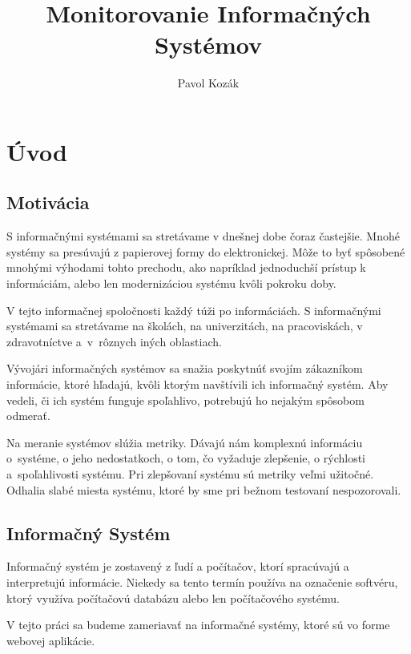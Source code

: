 \documentclass[a4paper, usesections, upjsfrontpage, thesismargins, thesislinespacing, twoside]{rnthesissvk}
\title{Monitorovanie Informačných Systémov}
\author{Pavol Kozák}
\begin{document}
\maketitle
\newpage

\setcounter{tocdepth}{3}
\tableofcontents

\newpage
\section{Úvod}

\subsection{Motivácia}

S informačnými systémami sa stretávame v dnešnej dobe čoraz častejšie. 
Mnohé systémy sa presúvajú z papierovej formy do elektronickej.
Môže to byť spôsobené mnohými výhodami tohto prechodu, ako napríklad jednoduchší prístup k informáciám, alebo len modernizáciou systému kvôli pokroku doby.

V tejto informačnej spoločnosti každý túži po informáciách.
S informačnými systémami sa stretávame na školách, na univerzitách, na pracoviskách, v zdravot\-níc\-tve a~v~rôznych iných oblastiach.

Vývojári informačných systémov sa snažia poskytnúť svojím zákazníkom informácie, ktoré hľadajú, kvôli ktorým navštívili ich informačný systém.
Aby vedeli, či ich systém funguje spoľahlivo, potrebujú ho nejakým spôsobom odmerať.

Na meranie systémov slúžia metriky.
Dávajú nám komplexnú informáciu o~systéme, o jeho nedostatkoch, o tom, čo vyžaduje zlepšenie, o rýchlosti a~spoľahli\-vos\-ti systému.
Pri zlepšovaní systému sú metriky veľmi užitočné.
Odhalia slabé miesta systému, ktoré by sme pri bežnom testovaní nespozorovali.

\subsection{Informačný Systém}

Informačný systém je zostavený z ľudí a počítačov, ktorí spracúvajú a interpretujú informácie.
Niekedy sa tento termín používa na označenie softvéru, ktorý využíva počítačovú databázu alebo len počítačového systému.

V tejto práci sa budeme zameriavať na informačné systémy, ktoré sú vo forme webovej aplikácie.
\end{document}
